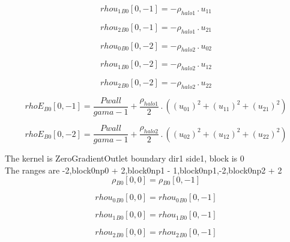 \documentclass{article}
\begin{document}
\begin{dmath}{rhou_{1}{_{B0}}}[{0,-1}] = - \rho_{halo 1} \,.\, u_{11}\end{dmath}

\begin{dmath}{rhou_{2}{_{B0}}}[{0,-1}] = - \rho_{halo 1} \,.\, u_{21}\end{dmath}

\begin{dmath}{rhou_{0}{_{B0}}}[{0,-2}] = - \rho_{halo 2} \,.\, u_{02}\end{dmath}

\begin{dmath}{rhou_{1}{_{B0}}}[{0,-2}] = - \rho_{halo 2} \,.\, u_{12}\end{dmath}

\begin{dmath}{rhou_{2}{_{B0}}}[{0,-2}] = - \rho_{halo 2} \,.\, u_{22}\end{dmath}

\begin{dmath}{rhoE{_{B0}}}[{0,-1}] = \frac{Pwall}{gama - 1} + \frac{\rho_{halo 1}}{2} \,.\, \left(\left(u_{01} \right)^{2} + \left(u_{11} \right)^{2} + \left(u_{21} \right)^{2}\right)\end{dmath}

\begin{dmath}{rhoE{_{B0}}}[{0,-2}] = \frac{Pwall}{gama - 1} + \frac{\rho_{halo 2}}{2} \,.\, \left(\left(u_{02} \right)^{2} + \left(u_{12} \right)^{2} + \left(u_{22} \right)^{2}\right)\end{dmath}

\noindent The kernel is ZeroGradientOutlet boundary dir1 side1, block is 0\\\noindent The ranges are -2,block0np0 + 2,block0np1 - 1,block0np1,-2,block0np2 + 2\\\begin{dmath}{\rho{_{B0}}}[{0,0}] = {\rho{_{B0}}}[{0,-1}]\end{dmath}

\begin{dmath}{rhou_{0}{_{B0}}}[{0,0}] = {rhou_{0}{_{B0}}}[{0,-1}]\end{dmath}

\begin{dmath}{rhou_{1}{_{B0}}}[{0,0}] = {rhou_{1}{_{B0}}}[{0,-1}]\end{dmath}

\begin{dmath}{rhou_{2}{_{B0}}}[{0,0}] = {rhou_{2}{_{B0}}}[{0,-1}]\end{dmath}
\end{document}
